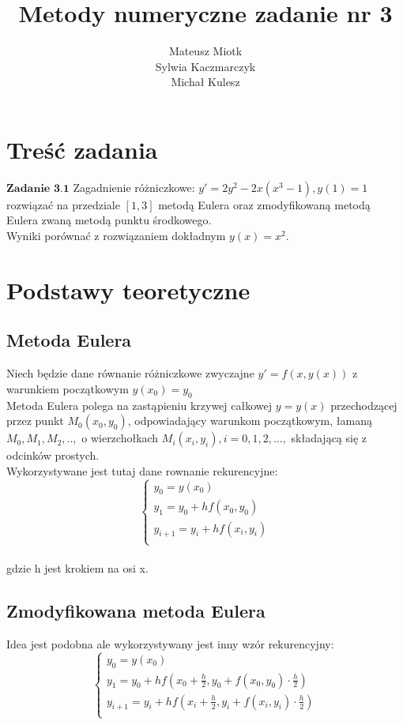 \documentclass[11pt]{article} %
\title{Metody numeryczne zadanie nr 3}
\author{Mateusz Miotk \\  Sylwia Kaczmarczyk \\ Michał Kulesz}
\begin{document}
\maketitle

\section{Treść zadania}
$\textbf{Zadanie 3.1} $ Zagadnienie różniczkowe: $y'=2y^2 -2x(x^3 - 1) , y(1)=1 $\\
rozwiązać na przedziale $[1,3]$ metodą Eulera oraz zmodyfikowaną metodą Eulera zwaną metodą punktu środkowego.\\
Wyniki porównać z rozwiązaniem dokładnym $y(x) = x^2$.

\section{Podstawy teoretyczne}
\subsection{Metoda Eulera}
Niech będzie dane równanie różniczkowe zwyczajne $y' = f(x,y(x))$ z warunkiem początkowym $y(x_0) = y_0$\\
Metoda Eulera polega na zastąpieniu krzywej całkowej $y = y(x)$ przechodzącej przez punkt $M_0(x_0,y_0)$, odpowiadający 
warunkom początkowym, łamaną $M_0,M_1,M_2,..,$ o wierzchołkach $M_i(x_i,y_i) , i=0,1,2,...,$ składającą się z odcinków prostych.\\
Wykorzystywane jest tutaj dane rownanie rekurencyjne: \\
$$
 \left\{ \begin{array}{ll}
 y_0 = y(x_0)\\
 y_1 = y_0+hf(x_0,y_0)\\
y_{i+1} = y_i + hf(x_i,y_i)\\
\end{array} \right.
$$
\\gdzie h jest krokiem na osi x.\\
\subsection{Zmodyfikowana metoda Eulera}
Idea jest podobna ale wykorzystywany jest inny wzór rekurencyjny: \\
$$
 \left\{ \begin{array}{ll}
 y_0 = y(x_0)\\
 y_1 = y_0+hf(x_0 + \frac{h}{2},y_0 + f(x_0,y_0)\cdot\frac{h}{2})\\
 y_{i+1} = y_i+hf(x_i + \frac{h}{2},y_i + f(x_i,y_i)\cdot\frac{h}{2})\\
\end{array} \right.
$$
\end{document}
